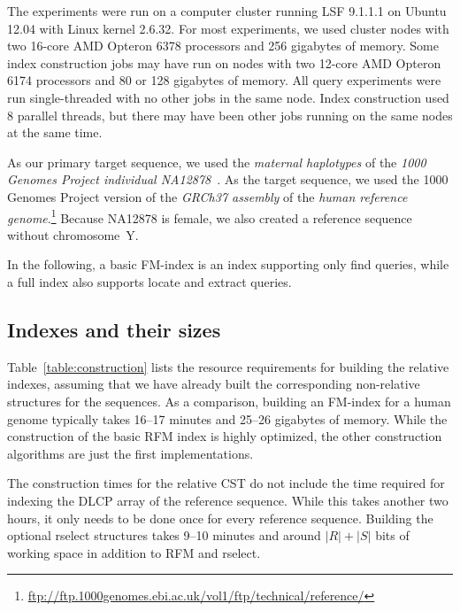 \documentclass[a4paper,11pt]{llncs}
\newcommand{\abs}[1]{\ensuremath{\lvert #1 \rvert}}
\newcommand{\CST}{\textsf{CST}}
\newcommand{\RFM}{\textsf{RFM}}
\newcommand{\DLCP}{\textsf{DLCP}}
\newcommand{\rselect}{\textsf{rselect}}
\newcommand{\find}{\textsf{find}}
\newcommand{\locate}{\textsf{locate}}
\newcommand{\extract}{\textsf{extract}}
\begin{document}
The experiments were run on a computer cluster running LSF 9.1.1.1 on Ubuntu 12.04 with Linux kernel 2.6.32. For most experiments, we used cluster nodes with two 16-core AMD Opteron 6378 processors and 256 gigabytes of memory. Some index construction jobs may have run on nodes with two 12-core AMD Opteron 6174 processors and 80 or 128 gigabytes of memory. All query experiments were run single-threaded with no other jobs in the same node. Index construction used 8 parallel threads, but there may have been other jobs running on the same nodes at the same time.

As our primary target sequence, we used the \emph{maternal haplotypes} of the \emph{1000 Genomes Project individual NA12878}~\cite{Rozowsky2011}. As the target sequence, we used the 1000 Genomes Project version of the \emph{GRCh37 assembly} of the \emph{human reference genome}.\footnote{\url{ftp://ftp.1000genomes.ebi.ac.uk/vol1/ftp/technical/reference/}} Because NA12878 is female, we also created a reference sequence without chromosome~Y.

In the following, a basic FM-index is an index supporting only \find{} queries, while a full index also supports \locate{} and \extract{} queries.

\subsection{Indexes and their sizes}

Table~\ref{table:construction} lists the resource requirements for building the relative indexes, assuming that we have already built the corresponding non-relative structures for the sequences. As a comparison, building an FM-index for a human genome typically takes 16--17 minutes and 25--26 gigabytes of memory. While the construction of the basic \RFM{} index is highly optimized, the other construction algorithms are just the first implementations.

The construction times for the relative \CST{} do not include the time required for indexing the \DLCP{} array of the reference sequence. While this takes another two hours, it only needs to be done once for every reference sequence. Building the optional \rselect{} structures takes 9--10 minutes and around $\abs{R} + \abs{S}$ bits of working space in addition to \RFM{} and \rselect.
\end{document}
